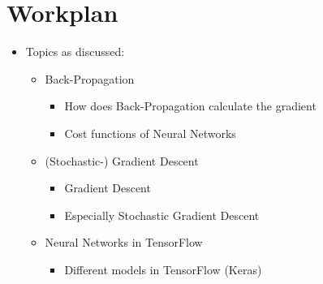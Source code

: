\documentclass[handout]{beamer}
\begin{document}
\section{Workplan}
\begin{frame}
    \begin{itemize}
        \item Topics as discussed:
        \begin{itemize}
            \item Back-Propagation
            \begin{itemize}
                \item How does Back-Propagation calculate the gradient
                \item Cost functions of Neural Networks 
            \end{itemize}
            \item (Stochastic-) Gradient Descent
            \begin{itemize}
                \item Gradient Descent
                \item Especially Stochastic Gradient Descent
            \end{itemize}
            \item Neural Networks in TensorFlow
            \begin{itemize}
                \item Different models in TensorFlow (Keras)
            \end{itemize}
        \end{itemize}
    \end{itemize}
\end{frame}
\end{document}
